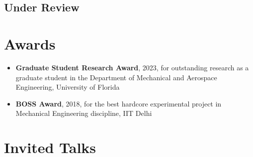 \documentclass[10pt, letterpaper]{article}
\begin{document}
\subsection*{Under Review}
\printbibliography[keyword=underreview, heading=none, resetnumbers=false]

\section{Awards}

\begin{itemize}
    \item \textbf{Graduate Student Research Award}, 2023, for outstanding research as a graduate student in the Department of Mechanical and Aerospace Engineering, University of Florida
    \item \textbf{BOSS Award}, 2018, for the best hardcore experimental project in Mechanical Engineering discipline, IIT Delhi
\end{itemize}

\section{Invited Talks}
\end{document}
